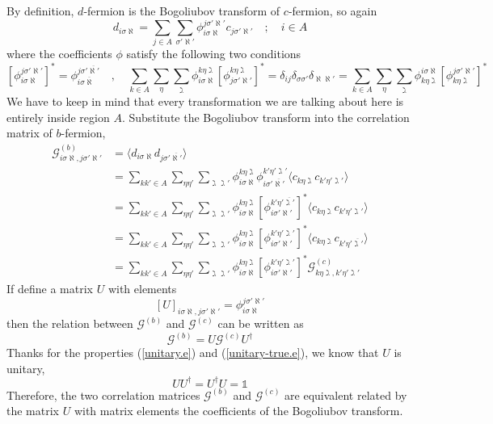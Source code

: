 \documentclass[12font]{article}
\theoremstyle{definition}
\numberwithin{equation}{section}
\newcommand{\anglelr}[1]{\langle #1 \rangle}
\newcommand{\lrm}[1]{\left[  #1  \right]}
\begin{document}
By definition, $d$-fermion is the Bogoliubov transform of $c$-fermion, so again
\[
d_{i\sigma\aleph} = \sum_{j\in A}\sum_{\sigma'\aleph'}\phi^{j\sigma'\aleph'}_{i\sigma\aleph}c_{j\sigma'\aleph'} \quad;\quad i\in A
\]
where the coefficients $\phi$ satisfy the following two conditions
\[
\lrm{\phi^{j\sigma'\aleph'}_{i\sigma\aleph}}^*= \phi^{j\sigma'\overline{\aleph'}}_{i\sigma\overline{\aleph}} 
\quad ,\quad 
\sum_{k\in A}\sum_{\eta}\sum_{\gimel} \phi^{k\eta\gimel}_{i\sigma\aleph} \lrm{\phi^{k\eta\gimel}_{j\sigma'\aleph'}}^* =\delta_{ij}\delta_{\sigma\sigma'}\delta_{\aleph\aleph'} = \sum_{k\in A}\sum_{\eta}\sum_{\gimel} \phi_{k\eta\gimel}^{i\sigma\aleph} \lrm{\phi_{k\eta\gimel}^{j\sigma'\aleph'}}^*
\]
We have to keep in mind that every transformation we are talking about here is entirely inside region $A$. Substitute the Bogoliubov transform into the correlation matrix of $b$-fermion,
\begin{align*}
  \mathcal{G}^{(b)}_{i\sigma\aleph,j\sigma'\aleph'} &= 
  \anglelr{ d_{i\sigma\aleph}d_{j\sigma'\overline{\aleph'}} } \\
  &= \sum_{kk'\in A}\sum_{\eta\eta'}\sum_{\gimel\gimel'} \phi_{i\sigma\aleph}^{k\eta\gimel} \phi_{i\sigma'\overline{\aleph'}}^{k'\eta'\gimel'} \anglelr{c_{k\eta\gimel}c_{k'\eta'\gimel'}} \\
  &=
  \sum_{kk'\in A}\sum_{\eta\eta'}\sum_{\gimel\gimel'} \phi_{i\sigma\aleph}^{k\eta\gimel} \lrm{\phi_{i\sigma'\aleph'}^{k'\eta'\overline{\gimel'}}}^* \anglelr{c_{k\eta\gimel}c_{k'\eta'\gimel'}} \\
  &= 
  \sum_{kk'\in A}\sum_{\eta\eta'}\sum_{\gimel\gimel'} \phi_{i\sigma\aleph}^{k\eta\gimel} \lrm{\phi_{i\sigma'\aleph'}^{k'\eta'\gimel'}}^* \anglelr{c_{k\eta\gimel}c_{k'\eta'\overline{\gimel'}}} \\
  &=
  \sum_{kk'\in A}\sum_{\eta\eta'}\sum_{\gimel\gimel'} \phi_{i\sigma\aleph}^{k\eta\gimel}
  \lrm{\phi_{i\sigma'\aleph'}^{k'\eta'\gimel'}}^* \mathcal{G}^{(c)}_{k\eta\gimel,k'\eta'\gimel'}
\end{align*}
If define a matrix $U$ with elements
\[
[U]_{i\sigma\aleph,j\sigma'\aleph'} = \phi_{i\sigma\aleph}^{j\sigma'\aleph'}
\]
then the relation between $\mathcal{G}^{(b)}$ and $\mathcal{G}^{(c)}$ can be written as
\[
\mathcal{G}^{(b)} = U\mathcal{G}^{(c)}U^\dagger
\]
Thanks for the properties (\ref{unitary.e}) and (\ref{unitary-true.e}), we know that $U$ is unitary,
\[
UU^\dagger = U^\dagger U = \mathds{1}
\]
Therefore, the two correlation matrices $\mathcal{G}^{(b)}$ and $\mathcal{G}^{(c)}$ are equivalent related by the matrix $U$ with matrix elements the coefficients of the Bogoliubov transform.
\end{document}
